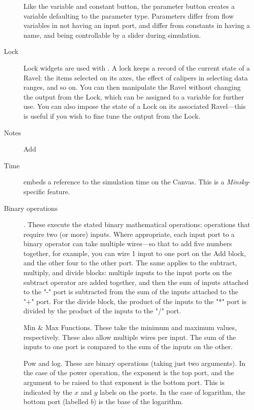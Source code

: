 \begin{description}
Like the variable and constant button, the parameter button creates
a variable defaulting to the parameter type. Parameters differ from
flow variables in not having an input port, and differ from constants
in having a name, and being controllable by a slider during simulation.
\item [{Lock}] Lock widgets  are used with .
A lock keeps a record of the current state of a Ravel: the items selected
on its axes, the effect of calipers in selecting data ranges, and
so on. You can then manipulate the Ravel without changing the output
from the Lock, which can be assigned to a variable for further use.
You can also impose the state of a Lock on its associated Ravel---this
is useful if you wish to fine tune the output from the Lock.
\item [{Notes}] Add 
\item [{Time}]  embeds a reference to the simulation
time on the Canvas. This is a \emph{Minsky}-specific feature.
\item [{Binary operations}] . These execute
the stated binary mathematical operations: operations that require
two (or more) inputs. Where appropriate, each input port to a binary
operator can take multiple wires---so that to add five numbers together,
for example, you can wire 1 input to one port on the Add block, and
the other four to the other port. The same applies to the subtract,
multiply, and divide blocks: multiple inputs to the input ports on
the subtract operator are added together, and then the sum of inputs
attached to the "-" port is subtracted from the sum of the inputs
attached to the "+" port. For the divide block, the product of the
inputs to the "{*}" port is divided by the product of the inputs
to the "/" port.


Min \& Max Functions. These take the minimum and maximum values, respectively.
These also allow multiple wires per input. The sum of the inputs to
one port is compared to the sum of the inputs on the other.

Pow and log. These are binary operations (taking just two arguments).
In the case of the power operation, the exponent is the top port,
and the argument to be raised to that exponent is the bottom port.
This is indicated by the $x$ and $y$ labels on the ports. In the
case of logarithm, the bottom port (labelled $b$) is the base of
the logarithm.


\end{description}
